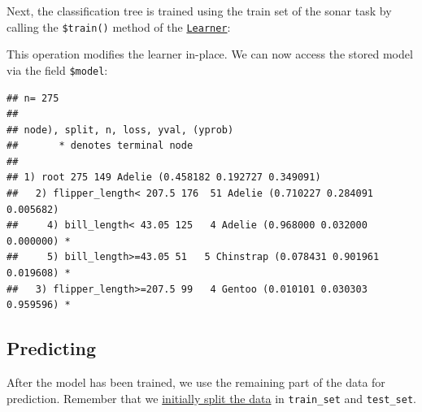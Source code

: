 \documentclass[
]{scrbook}
\newenvironment{Shaded}{\begin{snugshade}}{\end{snugshade}}
\newcommand{\AttributeTok}[1]{\textcolor[rgb]{0.77,0.63,0.00}{#1}}
\newcommand{\FunctionTok}[1]{\textcolor[rgb]{0.00,0.00,0.00}{#1}}
\newcommand{\NormalTok}[1]{#1}
\newcommand{\OtherTok}[1]{\textcolor[rgb]{0.56,0.35,0.01}{#1}}
\newcommand{\SpecialCharTok}[1]{\textcolor[rgb]{0.00,0.00,0.00}{#1}}
\renewenvironment{Shaded} {\begin{snugshade}\small} {\end{snugshade}}
\begin{document}
Next, the classification tree is trained using the train set of the sonar task by calling the \texttt{\$train()} method of the \href{https://mlr3.mlr-org.com/reference/Learner.html}{\texttt{Learner}}:

\begin{Shaded}
\end{Shaded}

This operation modifies the learner in-place.
We can now access the stored model via the field \texttt{\$model}:

\begin{Shaded}
\end{Shaded}

\begin{verbatim}
## n= 275 
## 
## node), split, n, loss, yval, (yprob)
##       * denotes terminal node
## 
## 1) root 275 149 Adelie (0.458182 0.192727 0.349091)  
##   2) flipper_length< 207.5 176  51 Adelie (0.710227 0.284091 0.005682)  
##     4) bill_length< 43.05 125   4 Adelie (0.968000 0.032000 0.000000) *
##     5) bill_length>=43.05 51   5 Chinstrap (0.078431 0.901961 0.019608) *
##   3) flipper_length>=207.5 99   4 Gentoo (0.010101 0.030303 0.959596) *
\end{verbatim}

\hypertarget{predicting}{%
\subsection{Predicting}\label{predicting}}

After the model has been trained, we use the remaining part of the data for prediction.
Remember that we \protect\hyperlink{split-data}{initially split the data} in \texttt{train\_set} and \texttt{test\_set}.

\begin{Shaded}
\end{Shaded}
\end{document}
